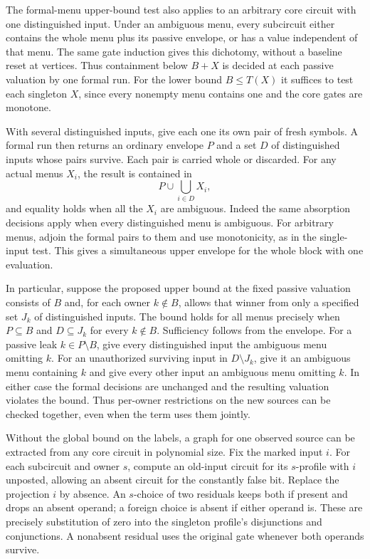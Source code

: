 The formal-menu upper-bound test also applies to
an arbitrary core circuit with one distinguished
input. Under an ambiguous menu, every subcircuit
either contains the whole menu plus its passive
envelope, or has a value independent of that
menu. The same gate induction gives this
dichotomy, without a baseline reset at vertices.
Thus containment below $B+X$ is decided at each
passive valuation by one formal run. For the
lower bound $B\le T(X)$ it suffices to test each
singleton $X$, since every nonempty menu contains
one and the core gates are monotone.

With several distinguished inputs, give each one
its own pair of fresh symbols. A formal run then
returns an ordinary envelope $P$ and a set $D$ of
distinguished inputs whose pairs survive. Each pair
is carried whole or discarded. For any actual
menus $X_i$, the result is contained in
\[
                         P\cup\bigcup_{i\in D}X_i ,
\]
and equality holds when all the $X_i$ are
ambiguous. Indeed the same absorption decisions
apply when every distinguished menu is ambiguous.
For arbitrary menus, adjoin the formal pairs to
them and use monotonicity, as in the single-input
test. This gives a simultaneous upper envelope
for the whole block with one evaluation.

In particular, suppose the proposed upper bound
at the fixed passive valuation consists of $B$
and, for each owner $k\notin B$, allows that
winner from only a specified set $J_k$ of
distinguished inputs. The bound holds for all
menus precisely when $P\subseteq B$ and
$D\subseteq J_k$ for every $k\notin B$.
Sufficiency follows from the envelope. For a
passive leak $k\in P\setminus B$, give every
distinguished input the ambiguous menu omitting
$k$. For an unauthorized surviving input in
$D\setminus J_k$, give it an ambiguous menu
containing $k$ and give every other input an
ambiguous menu omitting $k$. In either case the
formal decisions are unchanged and the resulting
valuation violates the bound. Thus per-owner
restrictions on the new sources can be checked
together, even when the term uses them jointly.

Without the global bound on the labels, a graph for
one observed source can be extracted from any core
circuit in polynomial size. Fix the marked input
$i$. For each subcircuit and owner $s$, compute an
old-input circuit for its $s$-profile with $i$
unposted, allowing an absent circuit for the
constantly false bit. Replace the projection $i$
by absence. An $s$-choice of two residuals keeps
both if present and drops an absent operand; a
foreign choice is absent if either operand is.
These are precisely substitution of zero into
the singleton profile's disjunctions and
conjunctions. A nonabsent residual uses the
original gate whenever both operands survive.

